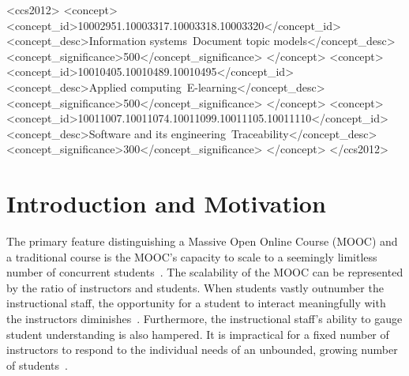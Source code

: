 \documentclass[sigconf, nonacm=true]{acmart}
\begin{document}
\begin{CCSXML}
<ccs2012>
<concept>
<concept_id>10002951.10003317.10003318.10003320</concept_id>
<concept_desc>Information systems~Document topic models</concept_desc>
<concept_significance>500</concept_significance>
</concept>
<concept>
<concept_id>10010405.10010489.10010495</concept_id>
<concept_desc>Applied computing~E-learning</concept_desc>
<concept_significance>500</concept_significance>
</concept>
<concept>
<concept_id>10011007.10011074.10011099.10011105.10011110</concept_id>
<concept_desc>Software and its engineering~Traceability</concept_desc>
<concept_significance>300</concept_significance>
</concept>
</ccs2012>
\end{CCSXML}



\maketitle

\section{Introduction and Motivation}
The primary feature distinguishing a Massive Open Online Course (MOOC) and a traditional course is the MOOC's capacity to scale to a seemingly limitless number of concurrent students~\cite{pappano2012year}.
The scalability of the MOOC can be represented by the ratio of instructors and students.
When students vastly outnumber the instructional staff, the opportunity for a student to interact meaningfully with the instructors diminishes~\cite{huang2014superposter}.
Furthermore, the instructional staff's ability to gauge student understanding is also hampered.
It is impractical for a fixed number of instructors to respond to the individual needs of an unbounded, growing number of students~\cite{mackness2010ideals}.
\end{document}
